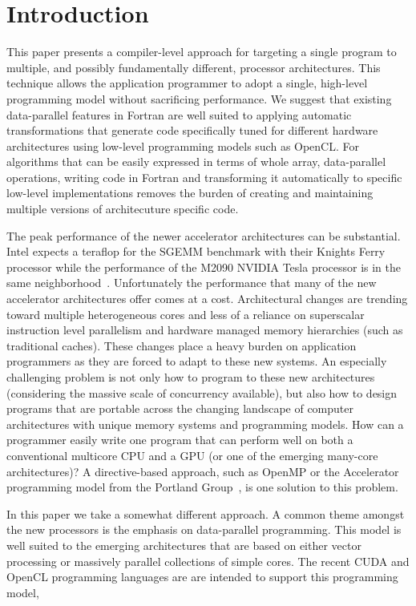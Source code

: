\section{Introduction}
\label{sec:intro}

This paper presents a compiler-level approach for targeting a single program to
multiple, and possibly fundamentally different, processor architectures.  This
technique allows the application programmer to adopt a single, high-level
programming model without sacrificing performance.  We suggest that existing
data-parallel features in Fortran are well suited to applying automatic
transformations that generate code specifically tuned for different hardware
architectures using low-level programming models such as OpenCL.  For algorithms
that can be easily expressed in terms of whole array, data-parallel operations,
writing code in Fortran and transforming it automatically to specific low-level
implementations removes the burden of creating and maintaining multiple versions
of architecuture specific code.

The peak performance of the newer accelerator architectures can be substantial.
Intel expects a teraflop for the SGEMM benchmark with their Knights Ferry
processor while the performance of the M2090 NVIDIA Tesla processor is in the
same neighborhood~\cite{hpcwire11manycore}.  Unfortunately the performance that
many of the new accelerator architectures offer comes at a cost.
Architectural changes are trending toward multiple heterogeneous cores and less
of a reliance on superscalar instruction level parallelism and hardware managed
memory hierarchies (such as traditional caches).  These changes place a heavy
burden on application programmers as they are forced to adapt to these new
systems.  An especially challenging problem is not only how to program to these
new architectures (considering the massive scale of concurrency available), but
also how to design programs that are portable across the changing landscape of
computer architectures with unique memory systems and programming models.  How
can a programmer easily write one program that can perform well on both a
conventional multicore CPU and a GPU (or one of the emerging many-core
architectures)?  A directive-based approach, such as OpenMP or the Accelerator
programming model from the Portland Group~\cite{pgi10accelerator}, is one
solution to this problem.

In this paper we take a somewhat different approach.  A common theme amongst the
new processors is the emphasis on data-parallel programming.  This model is well
suited to the emerging architectures that are based on either vector processing
or massively parallel collections of simple cores.  The recent CUDA and OpenCL
programming languages are are intended to support this programming model,

